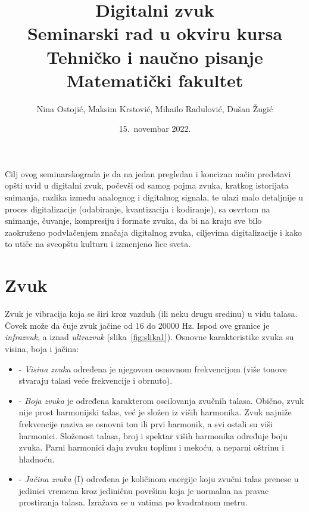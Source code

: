 \documentclass[a4paper]{article}
\begin{document}
\title{Digitalni zvuk\\ \small{Seminarski rad u okviru kursa\\Tehničko i naučno pisanje\\ Matematički fakultet}}

\author{Nina Ostojić, Maksim Krstović, Mihailo Radulović, Dušan Žugić}
\date{15.~novembar 2022.}
\maketitle

\abstract
Cilj ovog seminarskograda je da na jedan pregledan i koncizan način predstavi opšti uvid u digitalni zvuk, počevši od samog pojma zvuka, kratkog istorijata snimanja, razlika između analognog i digitalnog signala, te ulazi malo detaljnije u proces digitalizacije (odabiranje, kvantizacija i kodiranje), sa osvrtom na snimanje, čuvanje, kompresiju i formate zvuka, da bi na kraju sve bilo zaokruženo podvlačenjem značaja digitalnog zvuka, ciljevima digitalizacije i kako to utiče na sveopštu kulturu i izmenjeno lice sveta.

\tableofcontents

\newpage

\section{Zvuk}

    Zvuk je vibracija koja se širi kroz vazduh (ili neku drugu sredinu) u vidu talasa. Čovek može da čuje zvuk jačine od 16 do 20000 Hz. Ispod ove granice je \textit{infrazvuk}, a iznad \textit{ultrazvuk} (slika~\ref{fig:slika1}). Osnovne karakteristike zvuka su visina, boja i jačina:
    \begin {itemize}
        \item[-] \textit{Visina zvuka} određena je njegovom osnovnom frekvencijom (više tonove stvaraju talasi
        veće frekvencije i obrnuto).
    
        \item[-] \textit{Boja zvuka} je određena karakterom oscilovanja zvučnih talasa. Obično, zvuk nije prost
        harmonijski talas, već je složen iz viših harmonika. Zvuk najniže frekvencije naziva se osnovni ton ili prvi harmonik, a svi ostali su viši harmonici. Složenost talasa, broj i spektar viših
        harmonika određuje boju zvuka. Parni harmonici daju zvuku toplinu i mekoću, a neparni
        oštrinu i hladnoću.
    
        \item[-] \textit{Jačina zvuka} (I) određena je količinom energije koju zvučni talas prenese u jedinici
        vremena kroz jediničnu površinu koja je normalna na pravac prostiranja talasa. Izražava se
        u vatima po kvadratnom metru.
    \end{itemize}
  
\end{document}

